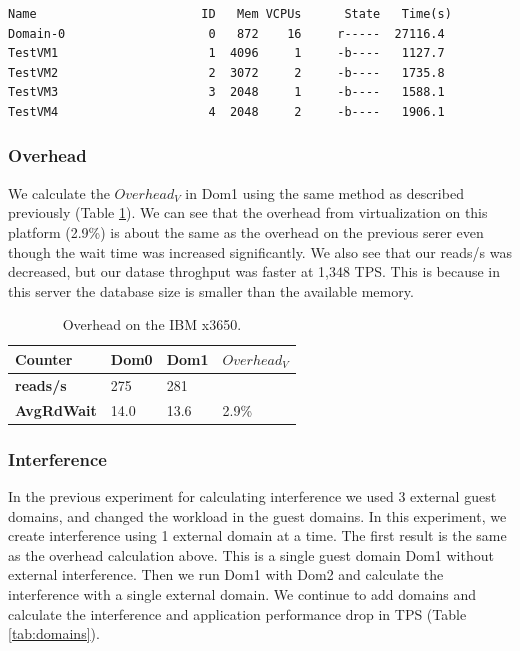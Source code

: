 \begin{Verbatim}
Name                       ID   Mem VCPUs      State   Time(s)
Domain-0                    0   872    16     r-----  27116.4
TestVM1                     1  4096     1     -b----   1127.7
TestVM2                     2  3072     2     -b----   1735.8
TestVM3                     3  2048     1     -b----   1588.1
TestVM4                     4  2048     2     -b----   1906.1
\end{Verbatim}

\subsubsection{Overhead}
We calculate the $Overhead_V$ in Dom1 using the same method as described previously (Table \ref{tab:OverheadBus}).  We can see that the overhead from virtualization on this platform (2.9\%) is about the same as the overhead on the previous serer even though the wait time was increased significantly.  We also see that our reads/s was decreased, but our datase throghput was faster at 1,348 TPS.  This is because in this server the database size is smaller than the available memory.

\begin{table}[h]
\begin{tabular}{ l l l p{5cm} }
  Counter     & Dom0 & Dom1 & $Overhead_V$ \\
  \hline
    \textbf{reads/s}    & 275  & 281 & \\
    \textbf{AvgRdWait}  & 14.0 & 13.6 & 2.9\% \\ 
  \hline
\end{tabular}
\caption{Overhead on the IBM x3650.}
\label{tab:OverheadBus}
\end{table}

\subsubsection{Interference}
In the previous experiment for calculating interference we used 3 external guest domains, and changed the workload in the guest domains.  In this experiment, we create interference using 1 external domain at a time.  The first result is the same as the overhead calculation above.  This is a single guest domain Dom1 without external interference.  Then we run Dom1 with Dom2 and calculate the interference with a single external domain.  We continue to add domains and calculate the interference and application performance drop in TPS (Table \ref{tab:domains}).

